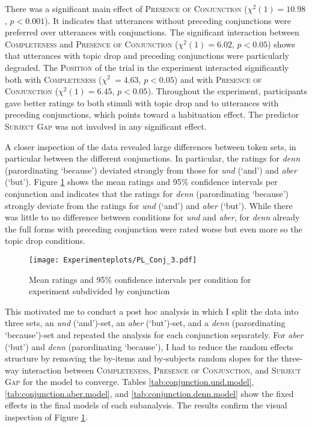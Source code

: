 \noindent
There was a significant main effect of \textsc{Presence of Conjunction} ($\chi^2(1) = 10.98$, $p < 0.001$).
It indicates that utterances without preceding conjunctions were preferred over utterances with conjunctions.
The significant interaction  between \textsc{Completeness} and \textsc{Presence of Conjunction} ($\chi^2(1) = 6.02$, $p < 0.05$) shows that utterances with topic drop and preceding conjunctions were particularly degraded.
The \textsc{Position} of the trial in the experiment interacted significantly both with \textsc{Completeness} ($\chi^2~= 4.63$, $p < 0.05$) and with \textsc{Presence of Conjunction} ($\chi^2(1) = 6.45$, $p < 0.05$).
Throughout the experiment, participants gave better ratings to both stimuli with topic drop and to utterances with preceding conjunctions, which points toward a habituation effect.
The predictor \textsc{Subject Gap} was not involved in any significant effect.

A closer inspection of the data revealed large differences between token sets, in particular between the different conjunctions.
In particular, the ratings for \textit{denn} (parordinating `because') deviated strongly from those for \textit{und} (`and') and \textit{aber} (`but').
Figure \ref{fig:pl.conjunctions.3} shows the mean ratings and 95\% confidence intervals per conjunction and indicates that the ratings for \textit{denn} (parordinating `because') strongly deviate from the ratings for \textit{und} (`and') and \textit{aber} (`but').
While there was little to no difference between conditions for \textit{und} and \textit{aber}, for \textit{denn} already the full forms with preceding conjunction were rated worse but even more so the topic drop conditions.

\begin{figure}
\centering
\texttt{[image: Experimenteplots/PL\_Conj\_3.pdf]}
\caption{Mean ratings and 95\% confidence intervals per condition for experiment  subdivided by conjunction}
\label{fig:pl.conjunctions.3}
\end{figure}

This motivated me to conduct a post hoc analysis in which I split the data into three sets, an \textit{und} (`and')-set, an \textit{aber} (`but')-set, and a \textit{denn} (parordinating `because')-set and repeated the analysis for each conjunction separately.
For \textit{aber} (`but') and \textit{denn} (parordinating `because'), I had to reduce the random effects structure by removing the by-items and by-subjects random slopes for the three-way interaction between \textsc{Completeness}, \textsc{Presence of Conjunction}, and \textsc{Subject Gap} for the model to converge.
Tables \ref{tab:conjunction.und.model}, \ref{tab:conjunction.aber.model}, and \ref{tab:conjunction.denn.model} show the fixed effects in the final models of each subanalysis.
The results confirm the visual inspection of Figure \ref{fig:pl.conjunctions.3}.

